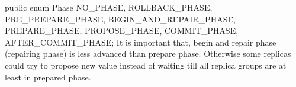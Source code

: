public enum Phase
{
   NO_PHASE,
   ROLLBACK_PHASE,
   PRE_PREPARE_PHASE,
   BEGIN_AND_REPAIR_PHASE,
   PREPARE_PHASE,
   PROPOSE_PHASE,
   COMMIT_PHASE,
   AFTER_COMMIT_PHASE;
}
It is important that, begin and repair phase (repairing phase) is less advanced than prepare phase. Otherwise some replicas could try to propose new value instead of waiting till all replica groups are at least in prepared phase.





